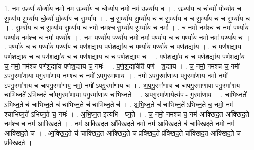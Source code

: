 \documentclass[17pt]{extarticle}
\begin{document}
1. नम॑ ऊ॒र्व्या॑ यो॒र्व्या॑य॒ नमो॒ नम॑ ऊ॒र्व्या॑य च चो॒र्व्या॑य॒ नमो॒ नम॑ ऊ॒र्व्या॑य च । . ऊ॒र्व्या॑य च चो॒र्व्या॑ यो॒र्व्या॑य च सू॒र्म्या॑य सू॒र्म्या॑य चो॒र्व्या॑ यो॒र्व्या॑य च सू॒र्म्या॑य । . च॒ सू॒र्म्या॑य सू॒र्म्या॑य च च सू॒र्म्या॑य च च सू॒र्म्या॑य च च सू॒र्म्या॑य च । . सू॒र्म्या॑य च च सू॒र्म्या॑य सू॒र्म्या॑य च॒ नमो॒ नम॑श्च सू॒र्म्या॑य सू॒र्म्या॑य च॒ नमः॑ । . च॒ नमो॒ नम॑श्च च॒ नमः॑ प॒र्ण्या॑य प॒र्ण्या॑य॒ नम॑श्च च॒ नमः॑ प॒र्ण्या॑य । . नमः॑ प॒र्ण्या॑य प॒र्ण्या॑य॒ नमो॒ नमः॑ प॒र्ण्या॑य च च प॒र्ण्या॑य॒ नमो॒ नमः॑ प॒र्ण्या॑य च । . प॒र्ण्या॑य च च प॒र्ण्या॑य प॒र्ण्या॑य च पर्णश॒द्या॑य पर्णश॒द्या॑य च प॒र्ण्या॑य प॒र्ण्या॑य च पर्णश॒द्या॑य । . च॒ प॒र्ण॒श॒द्या॑य पर्णश॒द्या॑य च च पर्णश॒द्या॑य च च पर्णश॒द्या॑य च च पर्णश॒द्या॑य च । . प॒र्ण॒श॒द्या॑य च च पर्णश॒द्या॑य पर्णश॒द्या॑य च॒ नमो॒ नम॑श्च पर्णश॒द्या॑य पर्णश॒द्या॑य च॒ नमः॑ । . प॒र्ण॒श॒द्या॑येति॑ पर्ण - श॒द्या॑य । . च॒ नमो॒ नम॑श्च च॒ नमो॑ ऽपगु॒रमा॑णाया पगु॒रमा॑णाय॒ नम॑श्च च॒ नमो॑ ऽपगु॒रमा॑णाय । . नमो॑ ऽपगु॒रमा॑णाया पगु॒रमा॑णाय॒ नमो॒ नमो॑ ऽपगु॒रमा॑णाय च चापगु॒रमा॑णाय॒ नमो॒ नमो॑ ऽपगु॒रमा॑णाय च । . अ॒प॒गु॒रमा॑णाय च चापगु॒रमा॑णाया पगु॒रमा॑णाय चाभिघ्न॒ते॑ ऽभिघ्न॒ते चा॑पगु॒रमा॑णाया पगु॒रमा॑णाय चाभिघ्न॒ते । . अ॒प॒गु॒रमा॑णा॒येत्य॑प - गु॒रमा॑णाय । . चा॒भि॒घ्न॒ते॑ ऽभिघ्न॒ते च॑ चाभिघ्न॒ते च॑ चाभिघ्न॒ते च॑ चाभिघ्न॒ते च॑ । . अ॒भि॒घ्न॒ते च॑ चाभिघ्न॒ते॑ ऽभिघ्न॒ते च॒ नमो॒ नम॑ श्चाभिघ्न॒ते॑ ऽभिघ्न॒ते च॒ नमः॑ । . अ॒भि॒घ्न॒त इत्य॑भि - घ्न॒ते । . च॒ नमो॒ नम॑श्च च॒ नम॑ आक्खिद॒त आ᳚क्खिद॒ते नम॑श्च च॒ नम॑ आक्खिद॒ते । . नम॑ आक्खिद॒त आ᳚क्खिद॒ते नमो॒ नम॑ आक्खिद॒ते च॑ चाक्खिद॒ते नमो॒ नम॑ आक्खिद॒ते च॑ । . आ॒क्खि॒द॒ते च॑ चाक्खिद॒त आ᳚क्खिद॒ते च॑ प्रक्खिद॒ते प्र॑क्खिद॒ते चा᳚क्खिद॒त आ᳚क्खिद॒ते च॑ प्रक्खिद॒ते । \newline
\end{document}
